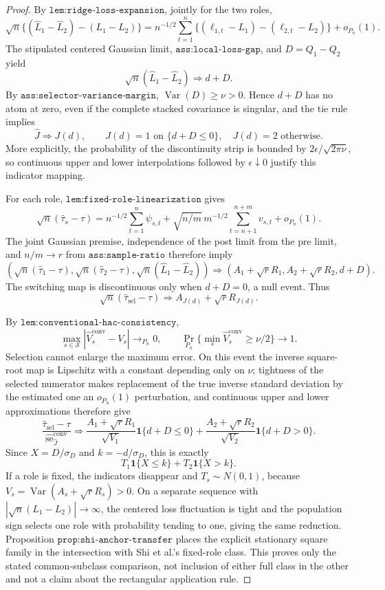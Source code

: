 \documentclass{article}
\begin{document}
\begin{proof}
By \(\texttt{lem:ridge-loss-expansion}\), jointly for the two roles,
\[
 \sqrt n\{(\widehat L_1-\widehat L_2)-(L_1-L_2)\}
 =n^{-1/2}\sum_{t=1}^n\{(\ell_{1,t}-L_1)-(\ell_{2,t}-L_2)\}+o_{P_n}(1).
\]
The stipulated centered Gaussian limit, \(\texttt{ass:local-loss-gap}\), and \(D=Q_1-Q_2\) yield
\[
 \sqrt n(\widehat L_1-\widehat L_2)\Rightarrow d+D.
\]
By \(\texttt{ass:selector-variance-margin}\), \(\operatorname{Var}(D)\geq\nu>0\).  Hence \(d+D\) has no atom at zero, even if the complete stacked covariance is singular, and the tie rule implies
\[
 \widehat J\Rightarrow J(d),\qquad
 J(d)=1\text{ on }\{d+D\leq0\},\quad J(d)=2\text{ otherwise}.
\]
More explicitly, the probability of the discontinuity strip is bounded by \(2\epsilon/\sqrt{2\pi\nu}\), so continuous upper and lower interpolations followed by \(\epsilon\downarrow0\) justify this indicator mapping.

For each role, \(\texttt{lem:fixed-role-linearization}\) gives
\[
 \sqrt n(\widehat\tau_s-\tau)
 =n^{-1/2}\sum_{t=1}^n\psi_{s,t}
 +\sqrt{n/m}\,m^{-1/2}\sum_{t=n+1}^{n+m}v_{s,t}+o_{P_n}(1).
\]
The joint Gaussian premise, independence of the post limit from the pre limit, and \(n/m\to r\) from \(\texttt{ass:sample-ratio}\) therefore imply
\[
 \left(\sqrt n(\widehat\tau_1-\tau),\sqrt n(\widehat\tau_2-\tau),
 \sqrt n(\widehat L_1-\widehat L_2)\right)
 \Rightarrow(A_1+\sqrt rR_1,A_2+\sqrt rR_2,d+D).
\]
The switching map is discontinuous only when \(d+D=0\), a null event.  Thus
\[
 \sqrt n(\widehat\tau_{\mathrm{sel}}-\tau)
 \Rightarrow A_{J(d)}+\sqrt rR_{J(d)}.
\]

By \(\texttt{lem:conventional-hac-consistency}\),
\[
 \max_{s\in\mathcal S}|\widehat V_s^{\mathrm{conv}}-V_s|\to_{P_n}0,
 \qquad
 \Pr_{P_n}\{\min_s\widehat V_s^{\mathrm{conv}}\geq\nu/2\}\to1.
\]
Selection cannot enlarge the maximum error.  On this event the inverse square-root map is Lipschitz with a constant depending only on \(\nu\); tightness of the selected numerator makes replacement of the true inverse standard deviation by the estimated one an \(o_{P_n}(1)\) perturbation, and continuous upper and lower approximations therefore give
\[
 \frac{\widehat\tau_{\mathrm{sel}}-\tau}
 {\widehat{\operatorname{se}}^{\mathrm{conv}}_{\widehat J}}
 \Rightarrow
 \frac{A_1+\sqrt rR_1}{\sqrt{V_1}}\mathbf1\{d+D\leq0\}
 +\frac{A_2+\sqrt rR_2}{\sqrt{V_2}}\mathbf1\{d+D>0\}.
\]
Since \(X=D/\sigma_D\) and \(k=-d/\sigma_D\), this is exactly
\[
 T_1\mathbf1\{X\leq k\}+T_2\mathbf1\{X>k\}.
\]
If a role is fixed, the indicators disappear and \(T_s\sim N(0,1)\), because \(V_s=\operatorname{Var}(A_s+\sqrt rR_s)>0\).  On a separate sequence with \(|\sqrt n(L_1-L_2)|\to\infty\), the centered loss fluctuation is tight and the population sign selects one role with probability tending to one, giving the same reduction.  Proposition \(\texttt{prop:shi-anchor-transfer}\) places the explicit stationary square family in the intersection with Shi et al.'s fixed-role class.  This proves only the stated common-subclass comparison, not inclusion of either full class in the other and not a claim about the rectangular application rule.
\end{proof}
\end{document}
